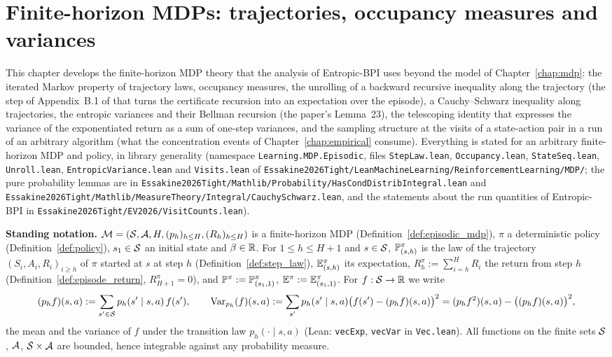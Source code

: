 \chapter{Finite-horizon MDPs: trajectories, occupancy measures and variances}
\label{chap:pre_mdp}

This chapter develops the finite-horizon MDP theory that the analysis of Entropic-BPI uses
beyond the model of Chapter~\ref{chap:mdp}: the iterated Markov property of trajectory laws,
occupancy measures, the unrolling of a backward recursive inequality along the trajectory
(the step of Appendix~B.1 of \cite{essakine2026tight} that turns the certificate recursion
into an expectation over the episode), a Cauchy--Schwarz inequality along trajectories, the
entropic variances and their Bellman recursion (the paper's Lemma~23), the telescoping
identity that expresses the variance of the exponentiated return as a sum of one-step
variances, and the sampling structure at the visits of a state-action pair in a run of an
arbitrary algorithm (what the concentration events of Chapter~\ref{chap:empirical} consume).
Everything is stated for an arbitrary finite-horizon MDP and policy, in library generality
(namespace \texttt{Learning.MDP.Episodic}, files \texttt{StepLaw.lean}, \texttt{Occupancy.lean},
\texttt{StateSeq.lean}, \texttt{Unroll.lean}, \texttt{EntropicVariance.lean} and \texttt{Visits.lean} of
\texttt{Essakine2026Tight/LeanMachineLearning/ReinforcementLearning/MDP/}; the pure probability
lemmas are in \texttt{Essakine2026Tight/Mathlib/Probability/HasCondDistribIntegral.lean} and
\texttt{Essakine2026Tight/Mathlib/MeasureTheory/Integral/CauchySchwarz.lean}, and the statements
about the run quantities of Entropic-BPI in \texttt{Essakine2026Tight/EV2026/VisitCounts.lean}).

\textbf{Standing notation.} $\mathcal M = (\mathcal{S}, \mathcal{A}, H, (p_h)_{h \le H}, (R_h)_{h \le H})$ is
a finite-horizon MDP (Definition~\ref{def:episodic_mdp}), $\pi$ a deterministic policy
(Definition~\ref{def:policy}), $s_1 \in \mathcal{S}$ an initial state and $\beta \in \mathbb{R}$. For
$1 \le h \le H + 1$ and $s \in \mathcal{S}$, $\mathbb{P}^\pi_{(s,h)}$ is the law of the trajectory
$(S_i, A_i, R_i)_{i \ge h}$ of $\pi$ started at $s$ at step $h$ (Definition~\ref{def:step_law}),
$\mathbb{E}^\pi_{(s,h)}$ its expectation, $R^\pi_h := \sum_{i = h}^H R_i$ the return from step $h$
(Definition~\ref{def:episode_return}, $R^\pi_{H+1} = 0$), and $\mathbb{P}^\pi := \mathbb{P}^\pi_{(s_1, 1)}$,
$\mathbb{E}^\pi := \mathbb{E}^\pi_{(s_1,1)}$. For $f : \mathcal{S} \to \mathbb{R}$ we write
\[
  (p_h f)(s, a) := \sum_{s' \in \mathcal{S}} p_h(s' \mid s, a)\, f(s'), \qquad
  \operatorname{Var}_{p_h}(f)(s, a) := \sum_{s'} p_h(s' \mid s, a)\big(f(s') - (p_h f)(s,a)\big)^2
  = (p_h f^2)(s,a) - \big((p_h f)(s,a)\big)^2 ,
\]
the mean and the variance of $f$ under the transition law $p_h(\cdot \mid s, a)$ (Lean:
\texttt{vecExp}, \texttt{vecVar} in \texttt{Vec.lean}). All functions on the finite sets
$\mathcal{S}$, $\mathcal{A}$, $\mathcal{S} \times \mathcal{A}$ are bounded, hence integrable against any probability measure.

